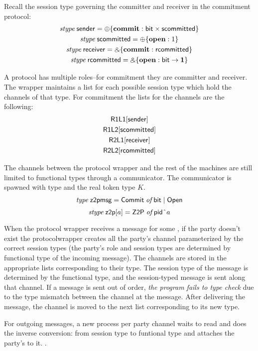 Recall the session type governing the committer and receiver in the commitment protocol:
\begin{gather}
	\mbox{\it stype} \; \mathsf{sender} = \oplus \{ \mathbf{commit} : \mathsf{bit} \times \mathsf{scommitted} \} \\
	\mbox{\it stype} \; \mathsf{scommitted} = \oplus \{ \mathbf{open} : 1 \} \\
	\mbox{\it stype} \; \mathsf{receiver} = \mathbin{\binampersand} \{ \mathbf{commit} : \mathsf{rcommitted} \} \\
	\mbox{\it stype} \; \mathsf{rcommitted} = \mathbin{\binampersand} \{ \mathbf{open} : \mathsf{bit} \rightarrow \mathbf{1} \}
\end{gather}

A protocol has multiple roles--for commitment they are committer and receiver.
The wrapper maintains a list for each possible session type which hold the channels of that type. 
For commitment the lists for the  channels are the following:
\begin{gather}
	\mathsf{R1L1}[\mathsf{sender}] \\
	\mathsf{R1L2}[\mathsf{scommitted}] \\
	\mathsf{R2L1}[\mathsf{receiver}] \\
	\mathsf{R2L2}[\mathsf{rcommitted}] 
\end{gather}

The channels between the protocol wrapper and the rest of the machines are still limited to functional types through a communicator. The communicator is spawned with type  and the real token type $K$.
\begin{gather}
\mbox{\it type} \; \mathsf{z2pmsg} = \mathsf{Commit} \; \mbox{\it of} \; \mathsf{bit} \; | \; \mathsf{Open}
\end{gather}
\[
	\mbox{\it stype} \; \mathsf{z2p}[a] = \mathsf{Z2P} \; \mbox{\it of} \; {\mathsf {pid}} \; \hat{ } \; a
\]

When the protocol wrapper receives a message for some , if the party doesn't exist the protocolwrapper creates all the party's channel parameterized by the correct session types (the party's role and session types are determined by functional type of the incoming message).
The channels are stored in the appropriate lists corresponding to their type.
The session type of the message is determined by the functional type, and the session-typed message is sent along that channel.
If a message is sent out of order, \textit{the program fails to type check} due to the type mismatch between the channel at the message.
After delivering the message, the channel is moved to the next list corresponding to its new type.

For outgoing messages, a new process per party channel waits to read and does the inverse conversion: from session type to funtional type and attaches the party's  to it.
.

